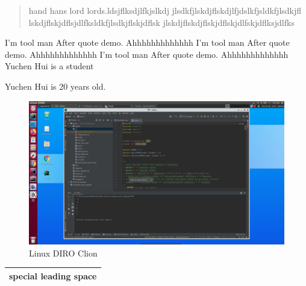 \documentclass{ctexart}
\begin{document}
      \begin{quote}
            hand hans lord lords.ldsjflksdjlfkjslkdj
            jlsdkfjlskdjflskdjlfjdslkfjsldkfjlsdkjfl
            lskdjflskjdflsjdlfksldkfjlsdkjflskjdflsk
            jlskdjflskdjflskjdflskjdlfskjdflksjdlfks
      \end{quote}
      I'm tool man After quote demo. Ahhhhhhhhhhhhh
      I'm tool man After quote demo. Ahhhhhhhhhhhhh
      I'm tool man After quote demo. Ahhhhhhhhhhhhh
      Yuchen Hui is a student 

      Yuchen Hui is 20 years old.\\
      \begin{figure}[h]
            \centering
            \includegraphics[scale=0.2]{linuxDirotp0.png}
            \caption{Linux DIRO Clion}
            \label{fig:linuxDIRO}
      \end{figure}
      
      \vspace{1.1em}
      \begin{tabular}[]{@{!`!`!`!`!`!`} c @{!!!!!}}
            \hline
            special leading space\footnotemark\\
            \hline
      \end{tabular}
      \newline
\end{document}
